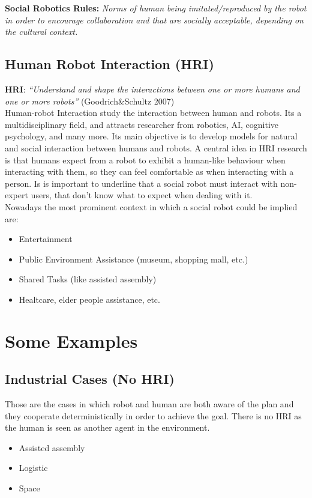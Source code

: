 \documentclass[pdftex,12pt,a4paper]{report}
\begin{document}
\noindent\textbf{Social Robotics Rules:} \textit{Norms of human being imitated/reproduced by the robot in order to encourage collaboration and that are socially acceptable, depending on the cultural context.}\\ 
\subsection{Human Robot Interaction (HRI)}
\textbf{HRI}: \textit{“Understand and shape the interactions between
one or more humans and one or more robots”} (Goodrich\&Schultz 2007)\\
\newline
Human-robot Interaction study the interaction between human and robots. Its a multidisciplinary field, and attracts researcher from robotics, AI, cognitive psychology, and many more.
Its main objective is to develop models for natural and social interaction between humans and robots. 
A central idea in HRI research is that humans expect from a robot to exhibit a human-like behaviour when interacting with them, so they can feel comfortable as when interacting with a person. Is is important to underline that a social robot must interact with non-expert users, that don't know what to expect when dealing with it.\\

\noindent Nowadays the most prominent context in which a social robot could be implied are:
\begin{itemize}
\item Entertainment 
\item Public Environment Assistance (museum, shopping mall, etc.)
\item Shared Tasks (like assisted assembly)
\item Healtcare, elder people assistance, etc.
\end{itemize}

\section{Some Examples}
\subsection{Industrial Cases (No HRI)}
Those are the cases in which robot and human are both aware of the plan and they cooperate deterministically in order to achieve the goal. There is no HRI as the human is seen as another agent in the environment.
\begin{itemize}
\item Assisted assembly
\item Logistic 
\item Space
\end{itemize}
\end{document}
